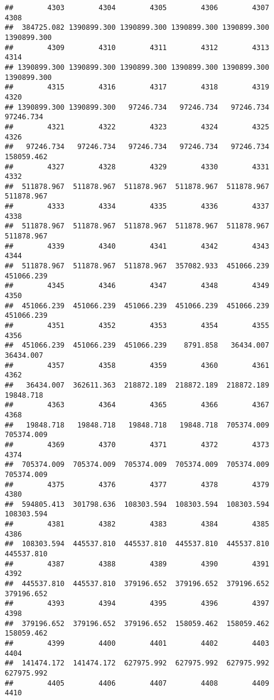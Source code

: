 \documentclass[
]{book}
\begin{document}
\begin{verbatim}
##        4303        4304        4305        4306        4307        4308 
##  384725.082 1390899.300 1390899.300 1390899.300 1390899.300 1390899.300 
##        4309        4310        4311        4312        4313        4314 
## 1390899.300 1390899.300 1390899.300 1390899.300 1390899.300 1390899.300 
##        4315        4316        4317        4318        4319        4320 
## 1390899.300 1390899.300   97246.734   97246.734   97246.734   97246.734 
##        4321        4322        4323        4324        4325        4326 
##   97246.734   97246.734   97246.734   97246.734   97246.734  158059.462 
##        4327        4328        4329        4330        4331        4332 
##  511878.967  511878.967  511878.967  511878.967  511878.967  511878.967 
##        4333        4334        4335        4336        4337        4338 
##  511878.967  511878.967  511878.967  511878.967  511878.967  511878.967 
##        4339        4340        4341        4342        4343        4344 
##  511878.967  511878.967  511878.967  357082.933  451066.239  451066.239 
##        4345        4346        4347        4348        4349        4350 
##  451066.239  451066.239  451066.239  451066.239  451066.239  451066.239 
##        4351        4352        4353        4354        4355        4356 
##  451066.239  451066.239  451066.239    8791.858   36434.007   36434.007 
##        4357        4358        4359        4360        4361        4362 
##   36434.007  362611.363  218872.189  218872.189  218872.189   19848.718 
##        4363        4364        4365        4366        4367        4368 
##   19848.718   19848.718   19848.718   19848.718  705374.009  705374.009 
##        4369        4370        4371        4372        4373        4374 
##  705374.009  705374.009  705374.009  705374.009  705374.009  705374.009 
##        4375        4376        4377        4378        4379        4380 
##  594805.413  301798.636  108303.594  108303.594  108303.594  108303.594 
##        4381        4382        4383        4384        4385        4386 
##  108303.594  445537.810  445537.810  445537.810  445537.810  445537.810 
##        4387        4388        4389        4390        4391        4392 
##  445537.810  445537.810  379196.652  379196.652  379196.652  379196.652 
##        4393        4394        4395        4396        4397        4398 
##  379196.652  379196.652  379196.652  158059.462  158059.462  158059.462 
##        4399        4400        4401        4402        4403        4404 
##  141474.172  141474.172  627975.992  627975.992  627975.992  627975.992 
##        4405        4406        4407        4408        4409        4410 

\end{verbatim}
\end{document}
